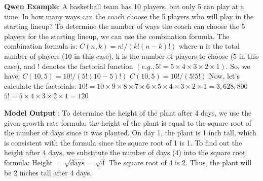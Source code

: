 \begin{wronganswer}
\label{fig:qwen_example}
 \small{\textbf{Qwen Example}: A basketball team has 10 players, but only 5 can play at a time. In how many ways can the coach choose the 5 players who will play in the starting lineup?\newline\newline
To determine the number of ways the coach can choose the 5 players for the starting lineup, we can use the combination formula. The combination formula is:\newline
$C(n, k) = n! / (k!(n-k)!)$\newline
where n is the total number of players (10 in this case), k is the number of players to choose (5 in this case), and ! denotes the factorial function $(e.g., 5! = 5 × 4 × 3 × 2 × 1)$.\newline
So, we have:\newline
$C(10, 5) = 10! / (5!(10-5)!)$\newline
$C(10, 5) = 10! / (5!5!)$\newline
Now, let's calculate the factorials:
$10! = 10 × 9 × 8 × 7 × 6 × 5 × 4 × 3 × 2 × 1 = 3,628,800$\newline
$5! = 5 × 4 × 3 × 2 × 1 = 120$\newline}

\small{\textbf{Model Output \xmark}: To determine the height of the plant after 4 days, we use the given growth rate formula: the height of the plant is equal to the square root of the number of days since it was planted.\newline
On day 1, the plant is 1 inch tall, which is consistent with the formula since the square root of 1 is 1.\newline
To find out the height after 4 days, we substitute the number of days (4) into the square root formula:\newline
Height $ = \sqrt{\text{days}} = \sqrt{4}$\newline
The square root of 4 is 2.\newline
Thus, the plant will be 2 inches tall after 4 days.
}

\end{wronganswer}
